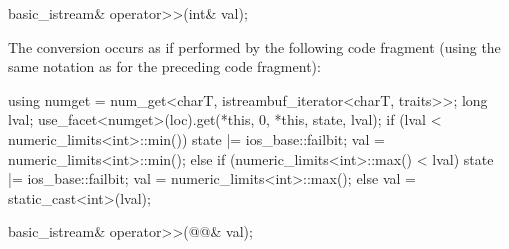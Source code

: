%
\begin{itemdecl}
basic_istream& operator>>(int& val);
\end{itemdecl}

\begin{itemdescr}
\pnum
The conversion occurs as if performed by the following code fragment
(using the same notation as for the preceding code fragment):
\begin{codeblock}
using numget = num_get<charT, istreambuf_iterator<charT, traits>>;
long lval;
use_facet<numget>(loc).get(*this, 0, *this, state, lval);
if (lval < numeric_limits<int>::min()) {
  state |= ios_base::failbit;
  val = numeric_limits<int>::min();
} else if (numeric_limits<int>::max() < lval) {
  state |= ios_base::failbit;
  val = numeric_limits<int>::max();
}  else
  val = static_cast<int>(lval);
\end{codeblock}
\end{itemdescr}

\begin{itemdecl}
basic_istream& operator>>(@@& val);
\end{itemdecl}

